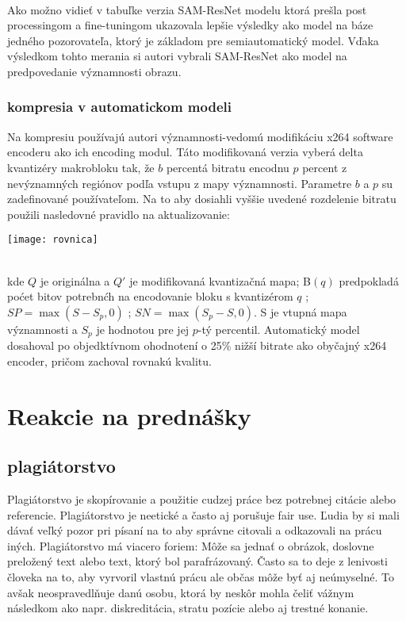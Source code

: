 \documentclass[10pt,twoside,slovak,a4paper]{article}
\begin{document}
\\
Ako možno vidieť v tabuľke verzia SAM-ResNet modelu ktorá prešla post processingom a fine-tuningom ukazovala lepšie výsledky ako model na báze jedného pozorovateľa, ktorý je základom pre semiautomatický model. Vďaka výsledkom tohto merania si autori\cite{Czarnecki:Progress} vybrali SAM-ResNet ako model na predpovedanie významnosti obrazu.
\subsubsection{kompresia v automatickom modeli}
Na kompresiu používajú autori\cite{Czarnecki:Progress} významnosti-vedomú modifikáciu x264 software encoderu ako ich encoding modul. Táto modifikovaná verzia vyberá delta kvantizéry makrobloku tak, že \(b\) percentá bitratu encodnu \(p\) percent z nevýznamných regiónov podľa vstupu z mapy významnosti. Parametre \(b\) a \(p\) su zadefinované používateľom. Na to aby dosiahli vyššie uvedené rozdelenie bitratu použili nasledovné pravidlo na aktualizovanie:
\begin{figure*}[tbh]
\centering
\texttt{[image: rovnica]}
\label{f:rovnica}
\end{figure*}
\\
kde \(Q\) je originálna a \({Q}'\) je modifikovaná kvantizačná mapa; B\((q)\) predpokladá poćet bitov potrebnćh na encodovanie bloku s kvantizérom \(q\) ; \(SP = \max(S - S_{p}, 0)\) ; \(SN = \max(S_{p} - S, 0)\). S je vtupná mapa významnosti a \(S_{p}\) je hodnotou pre jej \(p\)-tý percentil. Automatický model dosahoval po objedktívnom ohodnotení o 25\% nižší bitrate ako obyčajný x264 encoder, pričom zachoval rovnakú kvalitu. 
\section{Reakcie na prednášky}
\subsection{plagiátorstvo}
Plagiátorstvo je skopírovanie a použitie cudzej práce bez potrebnej citácie alebo referencie. Plagiátorstvo je neetické a často aj porušuje fair use. Ľudia by si mali dávať veľký pozor pri písaní na to aby správne citovali a odkazovali na prácu iných. Plagiátorstvo má viacero foriem: Môže sa jednať o obrázok, doslovne preložený text alebo text, ktorý bol parafrázovaný. Často sa to deje z lenivosti človeka na to, aby vyrvoril vlastnú prácu ale občas môže byť aj neúmyselné. To avšak neospravedlňuje danú osobu, ktorá by neskôr mohla čeliť vážnym následkom ako napr. diskreditácia, stratu pozície alebo aj trestné konanie.
\end{document}
